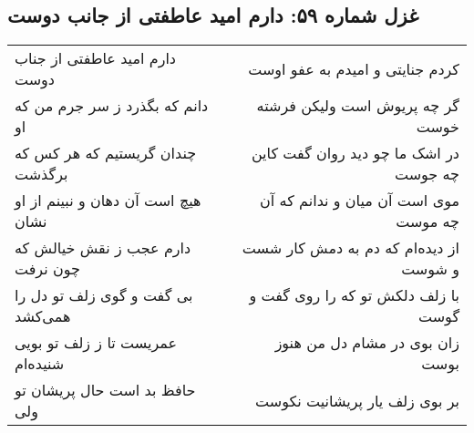 \begin{center}
\section*{غزل شماره ۵۹: دارم امید عاطفتی از جانب دوست}
\label{sec:sh059}
\begin{longtable}{l p{0.5cm} r}
دارم امید عاطفتی از جناب دوست
&&
کردم جنایتی و امیدم به عفو اوست
\\
دانم که بگذرد ز سر جرم من که او
&&
گر چه پریوش است ولیکن فرشته خوست
\\
چندان گریستیم که هر کس که برگذشت
&&
در اشک ما چو دید روان گفت کاین چه جوست
\\
هیچ است آن دهان و نبینم از او نشان
&&
موی است آن میان و ندانم که آن چه موست
\\
دارم عجب ز نقش خیالش که چون نرفت
&&
از دیده‌ام که دم به دمش کار شست و شوست
\\
بی گفت و گوی زلف تو دل را همی‌کشد
&&
با زلف دلکش تو که را روی گفت و گوست
\\
عمریست تا ز زلف تو بویی شنیده‌ام
&&
زان بوی در مشام دل من هنوز بوست
\\
حافظ بد است حال پریشان تو ولی
&&
بر بوی زلف یار پریشانیت نکوست
\\
\end{longtable}
\end{center}
